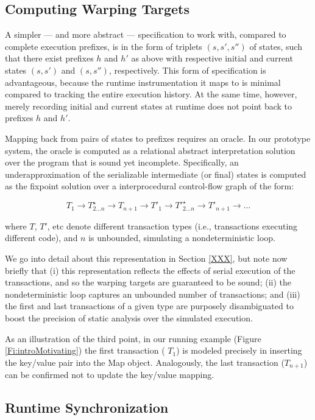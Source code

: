 \subsection{Computing Warping Targets}

A simpler --- and more abstract --- specification to work with, compared to complete execution prefixes, is in the form of triplets $(s,s',s'')$ of states, such that there exist prefixes $h$ and $h'$ as above with respective initial and current states $(s,s')$ and $(s,s'')$, respectively. This form of specification is advantageous, because the runtime instrumentation it maps to is minimal compared to tracking the entire execution history. At the same time, however, merely recording initial and current states at runtime does not point back to prefixes $h$ and $h'$.

Mapping back from pairs of states to prefixes requires an oracle. In our prototype system, the oracle is computed as a relational abstract interpretation solution over the program that is sound yet incomplete. Specifically, an underapproximation of the serializable intermediate (or final) states is computed as the fixpoint solution over a interprocedural control-flow graph of the form: 
\begin{center}
$$
	T_1 \rightarrow T^\star_{2 \ldots n} \rightarrow T_{n+1} \rightarrow T'_1 \rightarrow T'^\star_{2 \ldots n} \rightarrow T'_{n+1} \rightarrow \ldots
$$
\end{center}
where $T$, $T'$, etc denote different transaction types (i.e., transactions executing different code), and $n$ is unbounded, simulating a nondeterministic loop. 

We go into detail about this representation in Section \ref{XXX}, but note now briefly that (i) this representation reflects the effects of serial execution of the transactions, and so the warping targets are guaranteed to be sound; (ii) the nondeterministic loop captures an unbounded number of transactions; and (iii) the first and last transactions of a given type are purposely disambiguated to boost the precision of static analysis over the simulated execution.

As an illustration of the third point, in our running example (Figure \ref{Fi:introMotivating}) the first transaction ( $T_1$) is modeled precisely in inserting the key/value pair into the {\sf Map} object. Analogously, the last transaction ($T_{n+1}$) can be confirmed not to update the key/value mapping.

\subsection{Runtime Synchronization} 

